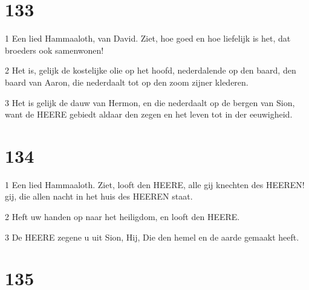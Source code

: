 \chapter{133}

\par 1 Een lied Hammaaloth, van David. Ziet, hoe goed en hoe liefelijk is het, dat broeders ook samenwonen!
\par 2 Het is, gelijk de kostelijke olie op het hoofd, nederdalende op den baard, den baard van Aaron, die nederdaalt tot op den zoom zijner klederen.
\par 3 Het is gelijk de dauw van Hermon, en die nederdaalt op de bergen van Sion, want de HEERE gebiedt aldaar den zegen en het leven tot in der eeuwigheid.

\chapter{134}

\par 1 Een lied Hammaaloth. Ziet, looft den HEERE, alle gij knechten des HEEREN! gij, die allen nacht in het huis des HEEREN staat.
\par 2 Heft uw handen op naar het heiligdom, en looft den HEERE.
\par 3 De HEERE zegene u uit Sion, Hij, Die den hemel en de aarde gemaakt heeft.

\chapter{135}

